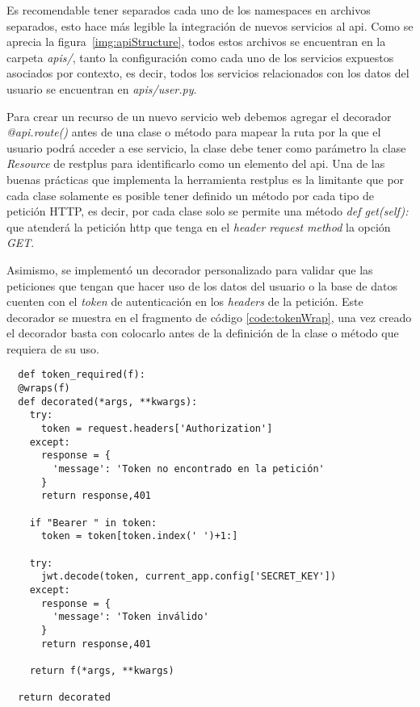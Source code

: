 Es recomendable tener separados cada uno de los namespaces en archivos separados, esto hace más legible la integración de nuevos servicios al api. Como se aprecia la figura~\ref{img:apiStructure}, todos estos archivos se encuentran en la carpeta \textit{apis/}, tanto la configuración como cada uno de los servicios expuestos asociados por contexto, es decir, todos los servicios relacionados con los datos del usuario se encuentran en \textit{apis/user.py}.

Para crear un recurso de un nuevo servicio web debemos agregar el decorador \textit{@api.route()} antes de una clase o método para mapear la ruta por la que el usuario podrá acceder a ese servicio, la clase debe tener como parámetro la clase \textit{Resource} de restplus para identificarlo como un elemento del api. Una de las buenas prácticas que implementa la herramienta restplus es la limitante que por cada clase solamente es posible tener definido un método por cada tipo de petición HTTP, es decir, por cada clase solo se permite una método \textit{def get(self):} que atenderá la petición http que tenga en el \textit{header request method} la opción \textit{GET}.

Asimismo, se implementó un decorador personalizado para validar que las peticiones que tengan que hacer uso de los datos del usuario o la base de datos cuenten con el \textit{token} de autenticación en los \textit{headers} de la petición. Este decorador se muestra en el fragmento de código \ref{code:tokenWrap}, una vez creado el decorador basta con colocarlo antes de la definición de la clase o método que requiera de su uso.

\begin{code}
\label{code:tokenWrap}
\begin{verbatim}
  def token_required(f):
  @wraps(f)
  def decorated(*args, **kwargs):
    try:
      token = request.headers['Authorization']
    except:
      response = {
        'message': 'Token no encontrado en la petición'
      }
      return response,401

    if "Bearer " in token:
      token = token[token.index(' ')+1:]

    try:
      jwt.decode(token, current_app.config['SECRET_KEY'])
    except:
      response = {
        'message': 'Token inválido'
      }
      return response,401

    return f(*args, **kwargs)

  return decorated
\end{verbatim}
\end{code}